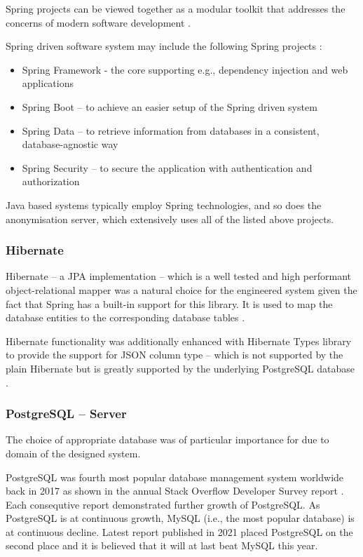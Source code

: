 \documentclass[a4paper,twoside,12pt]{book}
\begin{document}
Spring projects can be viewed together as a modular toolkit that addresses the concerns of modern software development \cite{bib:spring_in_action}.

Spring driven software system may include the following Spring projects \cite{bib:spring_docs}:
\begin{itemize}
\item Spring Framework - the core supporting e.g., dependency injection and web applications
\item Spring Boot – to achieve an easier setup of the Spring driven system
\item Spring Data – to retrieve information from databases in a consistent, database-agnostic way
\item Spring Security – to secure the application with authentication and authorization
\end{itemize}

Java based systems typically employ Spring technologies, and so does the anonymisation server, which extensively uses all of the listed above projects. 

\subsubsection{Hibernate}

Hibernate – a JPA implementation – which is a well tested and high performant \cite{bib:hibernate_high_performance} object-relational mapper was a natural choice for the engineered system given the fact that Spring has a built-in support for this library. It is used to map the database entities to the corresponding database tables \cite{bib:hibernate_docs}.

Hibernate functionality was additionally enhanced with Hibernate Types library \cite{bib:hibernate_types} to provide the support for JSON column type – which is not supported by the plain Hibernate but is greatly supported by the underlying PostgreSQL database \cite{bib:postgresql_json}.

\subsubsection{PostgreSQL – Server}

The choice of appropriate database was of particular importance for due to domain of the designed system.

PostgreSQL was fourth most popular database management system worldwide back in 2017 as shown in the annual Stack Overflow Developer Survey report \cite{bib:stackoverflow2017}. Each consequtive report demonstrated further growth of PostgreSQL. As PostgreSQL is at continuous growth, MySQL (i.e., the most popular database) is at continuous decline. Latest report published in 2021 \cite{bib:stackoverflow2021} placed PostgreSQL on the second place and it is believed that it will at last beat MySQL this year.
\end{document}
